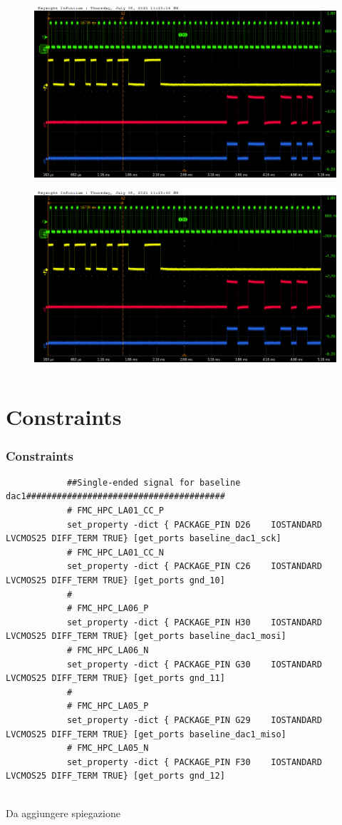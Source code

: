 \documentclass[aspectratio=169]{beamer}
\begin{document}
\begin{frame}
\begin{columns}
		\begin{center}
			\begin{figure}
				\includegraphics[width=0.55 \textwidth]{IMG/probe/09-08-2021_ch07-read53-baselinedac1.png}
				\caption{}
			\end{figure}
			\begin{figure}
				\includegraphics[width=0.55 \textwidth]{IMG/probe/09-08-2021_ch07-read54-baselinedac1.png}
				\caption{}
			\end{figure}	
		\end{center}
	\end{columns}
	\end{frame}

	\section{Constraints}
	
	\begin{frame}[fragile]
	\frametitle{Constraints}
	{\tiny 
		\begin{verbatim}
			##Single-ended signal for baseline dac1#######################################
			# FMC_HPC_LA01_CC_P
			set_property -dict { PACKAGE_PIN D26	IOSTANDARD LVCMOS25 DIFF_TERM TRUE}	[get_ports baseline_dac1_sck]
			# FMC_HPC_LA01_CC_N
			set_property -dict { PACKAGE_PIN C26	IOSTANDARD LVCMOS25 DIFF_TERM TRUE}	[get_ports gnd_10]
			#
			# FMC_HPC_LA06_P
			set_property -dict { PACKAGE_PIN H30	IOSTANDARD LVCMOS25 DIFF_TERM TRUE}	[get_ports baseline_dac1_mosi]
			# FMC_HPC_LA06_N
			set_property -dict { PACKAGE_PIN G30	IOSTANDARD LVCMOS25 DIFF_TERM TRUE}	[get_ports gnd_11]
			#
			# FMC_HPC_LA05_P
			set_property -dict { PACKAGE_PIN G29	IOSTANDARD LVCMOS25 DIFF_TERM TRUE}	[get_ports baseline_dac1_miso]
			# FMC_HPC_LA05_N
			set_property -dict { PACKAGE_PIN F30	IOSTANDARD LVCMOS25 DIFF_TERM TRUE}	[get_ports gnd_12]
				
		\end{verbatim} 
	}

		\color{red} Da aggiungere spiegazione
	\end{frame}
\end{document}
